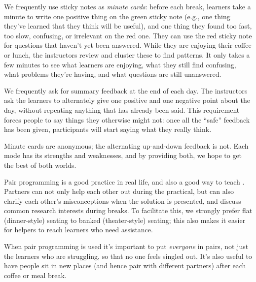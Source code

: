 


We frequently use sticky notes as \emph{minute cards}: before each
break, learners take a minute to write one positive thing on the green
sticky note (e.g., one thing they've learned that they think will be
useful), and one thing they found too fast, too slow, confusing, or
irrelevant on the red one. They can use the red sticky note for
questions that haven't yet been answered. While they are enjoying
their coffee or lunch, the instructors review and cluster these to
find patterns. It only takes a few minutes to see what learners are
enjoying, what they still find confusing, what problems they're
having, and what questions are still unanswered.


We frequently ask for summary feedback at the end of each day. The
instructors ask the learners to alternately give one positive and one
negative point about the day, without repeating anything that has
already been said. This requirement forces people to say things they
otherwise might not: once all the ``safe'' feedback has been given,
participants will start saying what they really think.

Minute cards are anonymous; the alternating up-and-down feedback is not.
Each mode has its strengths and weaknesses, and by providing both, we
hope to get the best of both worlds.


Pair programming is a good practice in real life, and also a good way
to teach \cite{bib:porter-what-works}. Partners can not only help each
other out during the practical, but can also clarify each other's
misconceptions when the solution is presented, and discuss common
research interests during breaks. To facilitate this, we strongly
prefer flat (dinner-style) seating to banked (theater-style) seating;
this also makes it easier for helpers to reach learners who need
assistance.

When pair programming is used it's important to put \emph{everyone} in
pairs, not just the learners who are struggling, so that no one feels
singled out. It's also useful to have people sit in new places (and
hence pair with different partners) after each coffee or meal break.

